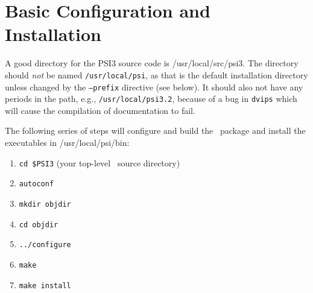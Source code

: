 \documentclass[12pt]{article}
\begin{document}
\section{Basic Configuration and Installation}

A good directory for the PSI3 source code is /usr/local/src/psi3.
The directory should {\em not} be named {\tt /usr/local/psi}, as that is
the default installation directory unless changed by the {\tt --prefix}
directive (see below).  It should also not have any periods in the path,
e.g., {\tt /usr/local/psi3.2}, because of a bug in {\tt dvips} which will
cause the compilation of documentation to fail.

The following series of steps will configure and build the \PSIthree\
package and install the executables in /usr/local/psi/bin:

\begin{enumerate}
\item {\tt cd \$PSI3} (your top-level \PSIthree\ source directory)
\item {\tt autoconf}
\item {\tt mkdir objdir}
\item {\tt cd objdir}
\item {\tt ../configure}
\item {\tt make}
\item {\tt make install}
\end{enumerate}
\end{document}
